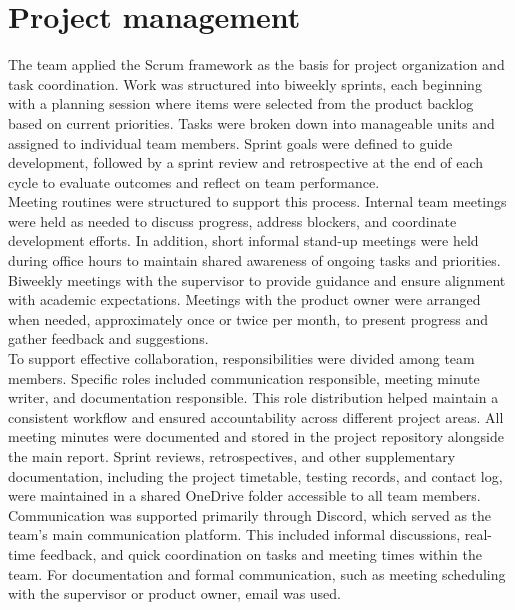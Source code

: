 \newpage

\section{Project management}
\label{sec:methods-project-management}
The team applied the Scrum framework as the basis for project organization and task coordination. Work was structured into biweekly sprints, each beginning with a planning session where items were selected from the product backlog based on current priorities. Tasks were broken down into manageable units and assigned to individual team members. Sprint goals were defined to guide development, followed by a sprint review and retrospective at the end of each cycle to evaluate outcomes and reflect on team performance. \\

Meeting routines were structured to support this process. Internal team meetings were held as needed to discuss progress, address blockers, and coordinate development efforts. In addition, short informal stand-up meetings were held during office hours to maintain shared awareness of ongoing tasks and priorities. Biweekly meetings with the supervisor to provide guidance and ensure alignment with academic expectations. Meetings with the product owner were arranged when needed, approximately once or twice per month, to present progress and gather feedback and suggestions. \\

To support effective collaboration, responsibilities were divided among team members. Specific roles included communication responsible, meeting minute writer, and documentation responsible. This role distribution helped maintain a consistent workflow and ensured accountability across different project areas. All meeting minutes were documented and stored in the project repository alongside the main report. Sprint reviews, retrospectives, and other supplementary documentation, including the project timetable, testing records, and contact log, were maintained in a shared OneDrive folder accessible to all team members. \\

Communication was supported primarily through Discord, which served as the team's main communication platform. This included informal discussions, real-time feedback, and quick coordination on tasks and meeting times within the team. For documentation and formal communication, such as meeting scheduling with the supervisor or product owner, email was used. \\

